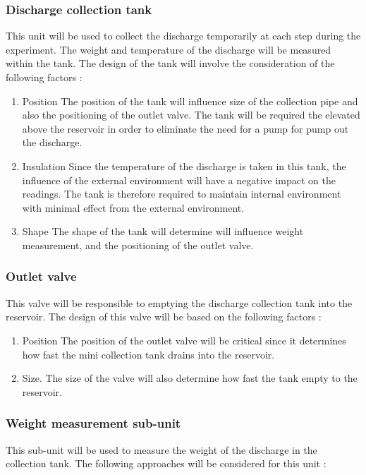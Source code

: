 \subsubsection{Discharge collection tank}
This unit will be used to collect the discharge temporarily at each step during the experiment. The weight and temperature of the discharge will be measured within the tank. The design of the tank will involve the consideration of the following factors :
\begin{enumerate}
    \item Position \newline
    The position of the tank will influence size of the collection pipe and also the positioning of the outlet valve. The tank will be required the elevated above the reservoir in order to eliminate the need for a pump for pump out the discharge. 
    \item Insulation \newline
    Since the temperature of the discharge is taken in this tank, the influence of the external environment will have a negative impact on the readings. The tank is therefore required to maintain internal environment with minimal effect from the external environment. 
    \item Shape \newline 
     The shape of the tank will determine will influence weight measurement, and the positioning of the outlet valve.
\end{enumerate}
\subsubsection{Outlet valve}
This valve will be responsible to emptying the discharge collection tank into the reservoir. The design of this valve will be based on the following factors :
\begin{enumerate}
    \item Position \newline 
    The position of the outlet valve will be critical since it determines how fast the mini collection tank drains into the reservoir.
    \item Size. \newline
    The size of the valve will also determine how fast the tank empty to the reservoir. 
\end{enumerate}
\subsubsection{Weight measurement sub-unit}
This sub-unit will be used to measure the weight of the discharge in the collection tank. The following approaches will be considered for this unit :

